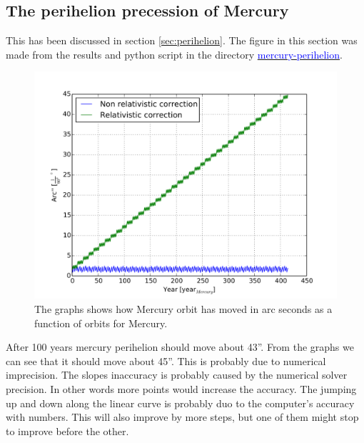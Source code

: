 \pagebreak
\subsection{The perihelion precession of Mercury}

This has been discussed in section \ref{sec:perihelion}. The figure in this section was made from the results and python script in the directory \href{https://github.com/erikfsk/Project-3/tree/master/Project3/mercury-perihelion}{\textcolor{blue}{mercury-perihelion}}.


\begin{figure}[H]
    \centering
    \includegraphics[width=0.8\linewidth]{result/bilder/perihelion.png}
    \caption{The graphs shows how Mercury orbit has moved in arc seconds as a function of orbits for Mercury.}
    \label{fig:perihelion}
\end{figure}

 After 100 years mercury perihelion should move about 43''. From the graphs we can see that it should move about 45''. This is probably due to numerical imprecision. The slopes inaccuracy is probably caused by the numerical solver precision. In other words more points would increase the accuracy. The jumping up and down along the linear curve is probably duo to the computer's accuracy with numbers. This will also improve by more steps, but one of them might stop to improve before the other.






